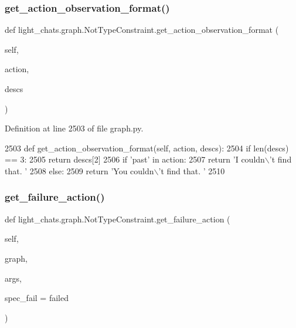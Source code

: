 \subsubsection{\texorpdfstring{get\+\_\+action\+\_\+observation\+\_\+format()}{get\_action\_observation\_format()}}
{\footnotesize\ttfamily def light\+\_\+chats.\+graph.\+Not\+Type\+Constraint.\+get\+\_\+action\+\_\+observation\+\_\+format (\begin{DoxyParamCaption}\item[{}]{self,  }\item[{}]{action,  }\item[{}]{descs }\end{DoxyParamCaption})}



Definition at line 2503 of file graph.\+py.


\begin{DoxyCode}
2503     \textcolor{keyword}{def }get\_action\_observation\_format(self, action, descs):
2504         \textcolor{keywordflow}{if} len(descs) == 3:
2505             \textcolor{keywordflow}{return} descs[2]
2506         \textcolor{keywordflow}{if} \textcolor{stringliteral}{'past'} \textcolor{keywordflow}{in} action:
2507             \textcolor{keywordflow}{return} \textcolor{stringliteral}{'I couldn\(\backslash\)'t find that. '}
2508         \textcolor{keywordflow}{else}:
2509             \textcolor{keywordflow}{return} \textcolor{stringliteral}{'You couldn\(\backslash\)'t find that. '}
2510 
\end{DoxyCode}
\mbox{\label{classlight__chats_1_1graph_1_1NotTypeConstraint_a006f37da6afe1dd06db790a6d19b07db}} 
\subsubsection{\texorpdfstring{get\+\_\+failure\+\_\+action()}{get\_failure\_action()}}
{\footnotesize\ttfamily def light\+\_\+chats.\+graph.\+Not\+Type\+Constraint.\+get\+\_\+failure\+\_\+action (\begin{DoxyParamCaption}\item[{}]{self,  }\item[{}]{graph,  }\item[{}]{args,  }\item[{}]{spec\+\_\+fail = {\ttfamily \textquotesingle{}failed\textquotesingle{}} }\end{DoxyParamCaption})}



